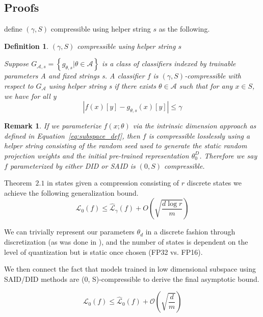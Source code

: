 \documentclass{article} %
\newtheorem{definition}{Definition}
\newtheorem{remark}{Remark}
\begin{document}
\subsection{Proofs}
\label{sec:proofs}
\cite{compression_generalization_gap} define $(\gamma, S)$ compressible using helper string $s$ as the following.
\begin{definition}
$(\gamma, S)$ compressible using helper string $s$ 

Suppose $G_{\mathcal{A},s}= \left\{g_{\theta,s}|\theta \in \mathcal{A}\right\}$ is a class of
classifiers indexed by trainable parameters A and fixed strings s. A classifier $f$ is $(\gamma, S)$-compressible
with respect to $G_{\mathcal{A}}$ using helper string s if there exists $\theta \in \mathcal{A}$ such that for any $x \in S$, we have
for all y
\begin{equation}
|f(x)[y] - g_{\theta,s}(x)[y]| \leq \gamma 
\end{equation}
\end{definition}
\begin{remark}
If we parameterize $f(x; \theta)$ via the intrinsic dimension approach as defined in Equation~\ref{eq:subspace_def}, then $f$ is compressible losslessly using a helper string consisting of the random seed used to generate the static random projection weights and the initial pre-trained representation $\theta^D_0$. Therefore we say $f$ parameterized by either DID or SAID is $\left(0, S\right)$ compressible.
\end{remark}
Theorem~$2.1$ in \cite{compression_generalization_gap} states given a compression consisting of $r$ discrete states we achieve the following generalization bound.
\begin{equation}
    \mathcal{L}_{0}(f) \leq \hat{\mathcal{L}}_{\gamma}(f) + O\left(\sqrt{\frac{d \log{r}}{m}}\right)
\end{equation}

We can trivially represent our parameters $\theta_d$ in a discrete fashion through discretization (as was done in \cite{compression_generalization_gap}), and the number of states is dependent on the level of quantization but is static once chosen (FP32 vs. FP16).

We then connect the fact that models trained in low dimensional subspace using SAID/DID methods are (0, S)-compressible to derive the final asymptotic bound.

\begin{equation}
    \mathcal{L}_{0}(f) \leq \hat{\mathcal{L}}_{0}(f) + \mathcal{O}\left(\sqrt{\frac{d}{m}}\right)
\end{equation}
\end{document}
